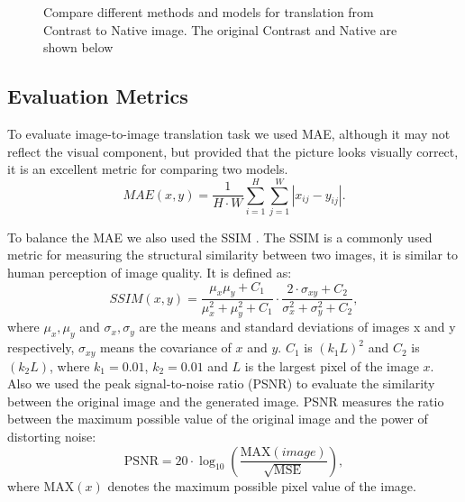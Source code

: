 \documentclass{article}
\begin{document}
\begin{figure}[h!]
    \centering
    \caption{Compare different methods and models for translation from Contrast to Native image. The original Contrast and Native are shown below}
    \label{app:image_visual}
\end{figure}

\subsection{Evaluation Metrics}

To evaluate image-to-image translation task we used MAE, although it may not reflect the visual component, but provided that the picture looks visually correct, it is an excellent metric for comparing two models.
\begin{equation}
MAE(x, y) = \frac{1}{H\cdot W}\sum\limits_{i=1}^H\sum\limits_{j=1}^W |x_{ij}-y_{ij}|.
\end{equation}

To balance the MAE we also used the SSIM \citep{1284395}. The SSIM is a commonly used metric for measuring the structural similarity between two images, it is similar to human perception of image quality. It is defined as:
\begin{equation}
SSIM(x, y) = \frac{\mu_x\mu_y+C_1}{\mu_x^2 + \mu_y^2+C_1} \cdot \frac{2\cdot\sigma_{xy}+C_2}{\sigma_x^2 + \sigma_y^2 + C_2},
\label{eq:ssim_loss}
\end{equation}
where $\mu_x, \mu_y$ and $\sigma_x, \sigma_y$ are the means and standard deviations of images x and y respectively, $\sigma_{xy}$ means the covariance of $x$ and $y$. $C_1$ is $(k_1L)^2$ and $C_2$ is $(k_2L)$, where $k_1 = 0.01$, $k_2 = 0.01$ and $L$ is the largest pixel of the image $x$.
Also we used the peak signal-to-noise ratio (PSNR) \citep{korhonen2012peak} to evaluate the similarity between the original image and the generated image. PSNR measures the ratio between the maximum possible value of the original image and the power of distorting noise:
\begin{equation}
\text{PSNR} = 20 \cdot \log_{10}\left( \frac{\text{MAX}(image)}{\sqrt{\text{MSE}}}\right),
\end{equation}
where $\text{MAX}(x)$ denotes the maximum possible pixel value of the image.


\end{document}
